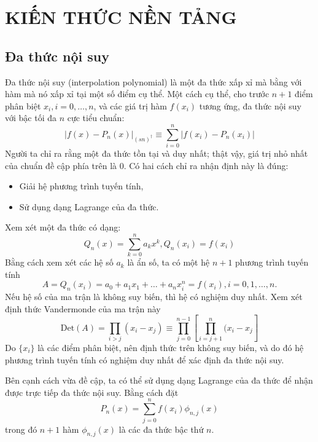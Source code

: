 \chapter{KIẾN THỨC NỀN TẢNG}

\section{Đa thức nội suy}

Đa thức nội suy (interpolation polynomial) là một đa thức xấp xỉ mà bằng với hàm mà nó xấp xỉ tại một số điểm cụ thể. Một cách cụ thể, cho trước $n + 1$ điểm phân biệt $x_i, i = 0, \dots, n$, và các giá trị hàm $f(x_i)$ tương ứng, đa thức nội suy với bậc tối đa $n$ cực tiểu chuẩn:
\begin{equation}
    \label{eq:norm_min}
    \left |  f(x) - P_n(x)\right |_{(sn)^{\dagger}} \equiv \sum_{i=0}^n\left |  f(x_i) - P_n(x_i)\right |
\end{equation}
Người ta chỉ ra rằng một đa thức tồn tại và duy nhất; thật vậy, giá trị nhỏ nhất của chuẩn đề cập phía trên là 0. Có hai cách chỉ ra nhận định này là đúng:
\begin{itemize}
    \item Giải hệ phương trình tuyến tính,
    \item Sử dụng dạng Lagrange của đa thức.
\end{itemize}

Xem xét một đa thức có dạng:
\begin{equation}
    \label{eq:lagrange_poly}
    Q_n(x) = \sum_{k=0}^na_kx^k, Q_n(x_i) = f(x_i)
\end{equation}
Bằng cách xem xét các hệ số $a_k$ là ẩn số, ta có một hệ $n+1$ phương trình tuyến tính
\begin{equation}
    A = Q_n(x_i) = a_0 + a_1x_1 + \dots + a_nx_i^{n} = f(x_i), i = 0, 1, \dots, n.
\end{equation}
Nếu hệ số của ma trận là không suy biến, thì hệ có nghiệm duy nhất. Xem xét định thức Vandermonde của ma trận này
\begin{equation}
    \label{eq:lagrange_sys}
    \text{Det}(A) = \prod_{i > j}(x_i - x_j) \equiv \prod_{j = 0}^{n-1}\left[\prod_{i=j+1}^n(x_i - x_j\right]
\end{equation}
Do $\{x_i\}$ là các điểm phân biệt, nên định thức trên không suy biến, và do đó hệ phương trình tuyến tính có nghiệm duy nhất để xác định đa thức nội suy.

Bên cạnh cách vừa đề cập, ta có thể sử dụng dạng Lagrange của đa thức để nhận được trực tiếp đa thức nội suy. Bằng cách đặt
\begin{equation}
    P_n(x) = \sum_{j = 0}^{n}f(x_i)\phi_{n, j}(x)
\end{equation}
trong đó $n+1$ hàm $\phi_{n, j}(x)$ là các đa thức bậc thứ $n$.

